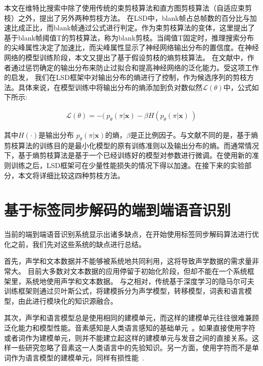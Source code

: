 本文在维特比搜索中除了使用传统的束剪枝算法\cite{forney1973viterbi}和直方图剪枝算法\cite{steinbiss1994improvements}（自适应束剪枝\cite{van1996adaptive}）之外，提出了另外两种剪枝方法。 在LSD中，blank帧占总帧数的百分比与加速比成正比，而blank帧通过公式进行判定。作为束剪枝算法的变体，这里提出了基于blank帧阈值T的剪枝算法，称为blank剪枝。当阈值T固定时，推理搜索分布的尖峰属性决定了加速比，而尖峰属性显示了神经网络输出分布的置信度。在神经网络的模型训练阶段，本文又提出了基于假设剪枝的熵剪枝算法。 在文献\cite{pereyra2017regularizing}中，作者通过惩罚确定的输出分布来防止过拟合和提高神经网络的泛化能力。受这项工作的启发， 我们在LSD框架中对输出分布的熵进行了控制，作为候选序列的剪枝方法。具体来说，在模型训练中将输出分布的熵添加到负对数似然$\mathcal{L}(\theta)$中，公式如下所示:
  
\begin{equation}
\label{equ:ent-pen-model}
\begin{split}
\mathcal{L}(\theta)= - (\ p_\theta (\pi|\mathbf{x}) - \beta H(p_\theta (\pi|\mathbf{x})\ )
\end{split}
\end{equation}

其中$H(\cdot)$是输出分布 $p_\theta (\pi|\mathbf{x})$的熵，$\beta$是正比例因子。与文献\cite{pereyra2017regularizing}不同的是，基于熵剪枝算法的训练目的是最小化模型的原有训练准则以及输出分布的熵。而通常情况下，基于熵剪枝算法是基于一个已经训练好的模型对参数进行微调。在使用新的准则训练之后，LSD框架可在少量性能损失的情况下得以加速。在接下来的实验部分，本文将详细比较这四种剪枝方法。


\section{基于标签同步解码的端到端语音识别}
\label{chap:lsd-e2e}

当前的端到端语音识别系统显示出诸多缺点，在开始使用标签同步解码算法进行优化之前，我们先对这些系统的缺点进行总结。

首先，声学和文本数据并不能够被系统地共同利用，这将导致声学数据的需求量非常大。
目前大多数对文本数据的应用停留于初始化阶段，但却不能在一个系统框架里，系统地使用声学和文本数据。
与之相对，传统基于深度学习的隐马尔可夫训练框架则通过贝叶斯公式，将建模拆分为声学模型，转移模型，词表和语言模型，由此进行模块化的知识源融合。

其次，声学和语言模型总是使用相同的建模单元，而这样的建模单元往往很难兼顾泛化能力和模型性能。音素感知是人类语言感知的基础单元~\cite{pisoni1985speech}。如果直接使用字符或者词作为建模单元，则并不能建立起这样的建模单元与发音之间的直接关系。这样一些研究忽略了音素这一人类语言中的先验知识。另一方面，使用字符而不是单词作为语言模型的建模单元，同样有损性能~\cite{jozefowicz2016exploring}.

